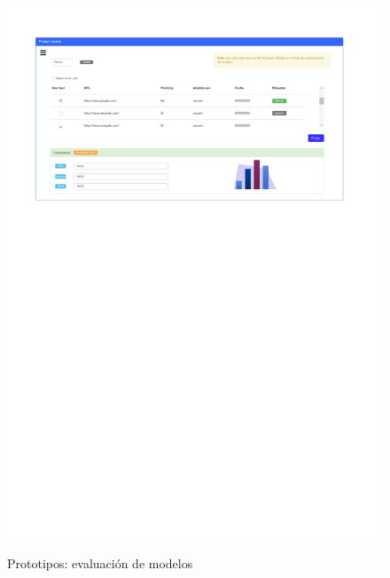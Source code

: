 \begin{figure}[h]
	\caption{Prototipos: evaluación de modelos}
	\centering
	\includegraphics[width=\textwidth]{../img/anexos/mockups/7-mockups-test_model}
	\label{mock:model-test}
\end{figure}

